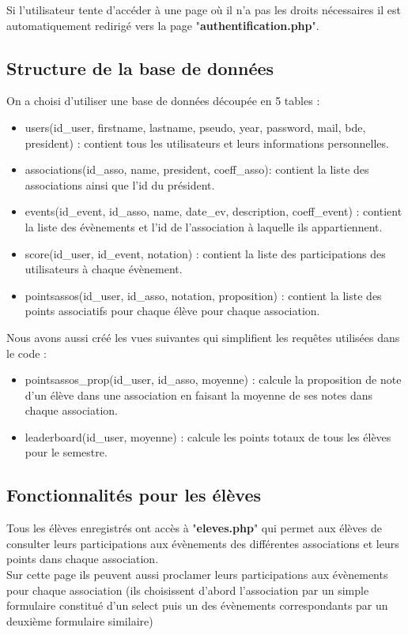 \documentclass[french]{article}
\begin{document}
 Si l'utilisateur tente d'accéder à une page où il n'a pas les droits nécessaires il est automatiquement redirigé vers la page "\textbf{authentification.php}". 
 \subsection{Structure de la base de données}
 On a choisi d'utiliser une base de données découpée en 5 tables : \\
 \begin{itemize}
 	\item users(id\_user, firstname, lastname, pseudo, year, password, mail, bde, president) : contient tous les utilisateurs et leurs informations personnelles.
 	\item associations(id\_asso, name, president, coeff\_asso): contient la liste des associations ainsi que l'id du président.
 	\item events(id\_event, id\_asso, name, date\_ev, description, coeff\_event) : contient la liste des évènements et l'id de l'association à laquelle ils appartiennent.
 	\item score(id\_user, id\_event, notation) : contient la liste des participations des utilisateurs à chaque évènement.
 	\item pointsassos(id\_user, id\_asso, notation, proposition) : contient la liste des points associatifs pour chaque élève pour chaque association.\\
 \end{itemize} 

Nous avons aussi créé les vues suivantes qui simplifient les requêtes utilisées dans le code : \\
\begin{itemize}
	\item pointsassos\_prop(id\_user, id\_asso, moyenne) : calcule la proposition de note d'un élève dans une association en faisant la moyenne de ses notes dans chaque association.
	\item leaderboard(id\_user, moyenne) : calcule les points totaux de tous les élèves pour le semestre.
\end{itemize}
\subsection{Fonctionnalités pour les élèves}
	Tous les élèves enregistrés ont accès à "\textbf{eleves.php}" qui permet aux élèves de consulter leurs participations aux évènements des différentes associations et leurs points dans chaque association. \\
	Sur cette page ils peuvent aussi proclamer leurs participations aux évènements pour chaque association (ils choisissent d'abord l'association par un simple formulaire constitué d'un select puis un des évènements correspondants par un deuxième formulaire similaire)\\
	
\end{document}
